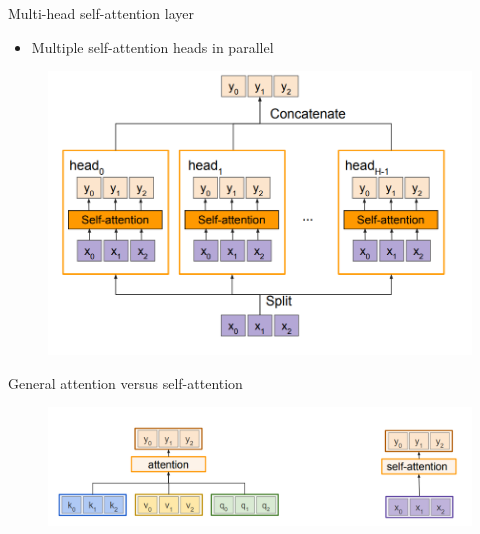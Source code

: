 \begin{frame}{Multi-head self-attention layer}
\begin{itemize}
    \item Multiple self-attention heads in parallel

\end{itemize}
\begin{figure}
\centering
\includegraphics[width=1.0\textwidth,height=0.8\textheight,keepaspectratio]{images/advanced-cv/attention_34.png}
\end{figure}
\end{frame}

\begin{frame}{General attention versus self-attention}
\begin{figure}
\centering
\includegraphics[width=1.0\textwidth,height=0.8\textheight,keepaspectratio]{images/advanced-cv/attention_35.png}
\end{figure}
    
\end{frame}

